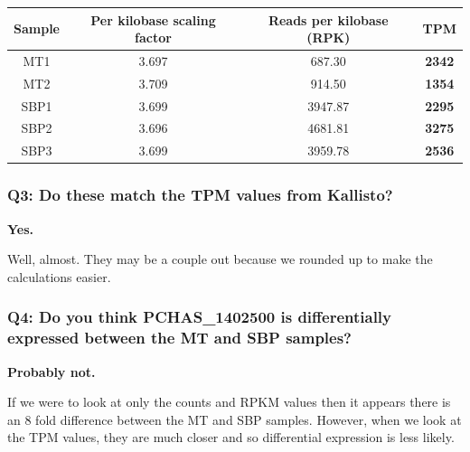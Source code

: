 \documentclass[11pt]{article}
\begin{document}
\begin{longtable}[]{@{}cccc@{}}
\toprule
Sample & Per kilobase scaling factor & Reads per kilobase (RPK) &
TPM\tabularnewline
\midrule
\endhead
MT1 & 3.697 & 687.30 & \textbf{2342}\tabularnewline
MT2 & 3.709 & 914.50 & \textbf{1354}\tabularnewline
SBP1 & 3.699 & 3947.87 & \textbf{2295}\tabularnewline
SBP2 & 3.696 & 4681.81 & \textbf{3275}\tabularnewline
SBP3 & 3.699 & 3959.78 & \textbf{2536}\tabularnewline
\bottomrule
\end{longtable}

\hypertarget{q3-do-these-match-the-tpm-values-from-kallisto}{%
\subsubsection{Q3: Do these match the TPM values from
Kallisto?}\label{q3-do-these-match-the-tpm-values-from-kallisto}}

\textbf{Yes.}

Well, almost. They may be a couple out because we rounded up to make the
calculations easier.

    \hypertarget{q4-do-you-think-pchas_1402500-is-differentially-expressed-between-the-mt-and-sbp-samples}{%
\subsubsection{Q4: Do you think PCHAS\_1402500 is differentially
expressed between the MT and SBP
samples?}\label{q4-do-you-think-pchas_1402500-is-differentially-expressed-between-the-mt-and-sbp-samples}}

\textbf{Probably not.}

If we were to look at only the counts and RPKM values then it appears
there is an 8 fold difference between the MT and SBP samples. However,
when we look at the TPM values, they are much closer and so differential
expression is less likely.


\end{document}
